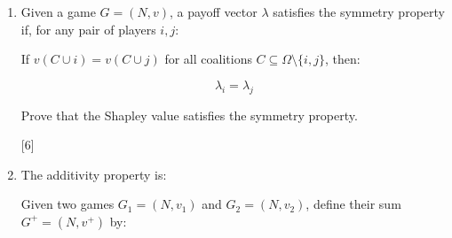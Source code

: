 \documentclass[12pt,a4paper]{article}
\begin{document}
\begin{enumerate}
\begin{enumerate}
            \[
                v_1(c) = \begin{cases}
                    0,& \text{if }c=\emptyset\\
                    8,& \text{if }c=\{1\}\\
                    5,& \text{if } c=\{2\}\\
                    9,& \text{if } c=\{3\}\\
                    10,& \text{if } c=\{1,2\}\\
                    11,& \text{if } c=\{2,3\}\\
                    18,& \text{if } c=\{1,3\}\\
                    30,& \text{if } c=\{1,2,3\}\\
                \end{cases}
                \qquad
                v_2(c) = \begin{cases}
                    0,& \text{if }c=\emptyset\\
                    80,& \text{if }c=\{1\}\\
                    10,& \text{if } c=\{2\}\\
                    12,& \text{if } c=\{3\}\\
                    80,& \text{if } c=\{1,2\}\\
                    12,& \text{if } c=\{2,3\}\\
                    80,& \text{if } c=\{1,3\}\\
                    80,& \text{if } c=\{1,2,3\}\\
                \end{cases}
            \]

        \hfill{[8]}

        \item 
Given a game $G = (N, v)$, a payoff vector $\lambda$ satisfies the symmetry property if, for any pair of players $i, j$:

If $v(C \cup i) = v(C \cup j)$ for all coalitions $C \subseteq \Omega \setminus \{i, j\}$, then:

$$
\lambda_i = \lambda_j
$$

            Prove that the Shapley value satisfies the symmetry property.

        \hfill{[6]}

        \item The additivity property is:

        Given two games \(G_1 = (N, v_1)\) and \(G_2 = (N, v_2)\), define their sum \(G^+ = (N, v^+)\) by:


\end{enumerate}
\end{enumerate}
\end{document}
